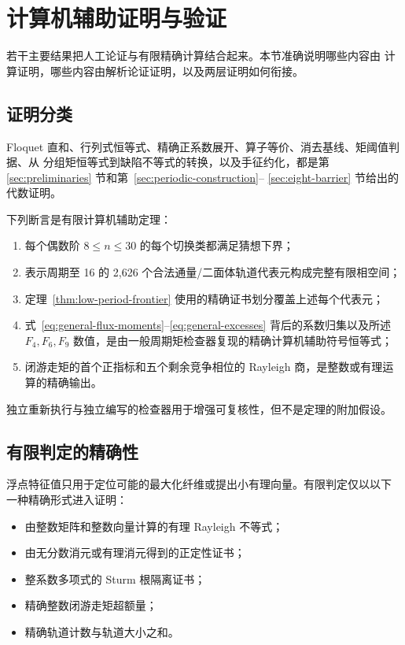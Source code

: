 \section{计算机辅助证明与验证}\label{sec:computational-verification}

若干主要结果把人工论证与有限精确计算结合起来。本节准确说明哪些内容由
计算证明，哪些内容由解析论证证明，以及两层证明如何衔接。

\subsection{证明分类}

Floquet 直和、行列式恒等式、精确正系数展开、算子等价、消去基线、矩阈值判据、从
分组矩恒等式到缺陷不等式的转换，以及手征约化，都是第~
\ref{sec:preliminaries} 节和第~\ref{sec:periodic-construction}--
\ref{sec:eight-barrier} 节给出的代数证明。

下列断言是有限计算机辅助定理：

\begin{enumerate}
\item 每个偶数阶 \(8\leq n\leq30\) 的每个切换类都满足猜想下界；
\item 表示周期至 16 的 2,626 个合法通量/二面体轨道代表元构成完整有限相空间；
\item 定理~\ref{thm:low-period-frontier} 使用的精确证书划分覆盖上述每个代表元；
\item 式~\eqref{eq:general-flux-moments}--\eqref{eq:general-excesses} 背后的系数归集以及所述 \(F_4,F_6,F_9\) 数值，是由一般周期矩检查器复现的精确计算机辅助符号恒等式；
\item 闭游走矩的首个正指标和五个剩余竞争相位的 Rayleigh 商，是整数或有理运算的精确输出。
\end{enumerate}

独立重新执行与独立编写的检查器用于增强可复核性，但不是定理的附加假设。

\subsection{有限判定的精确性}

浮点特征值只用于定位可能的最大化纤维或提出小有理向量。有限判定仅以以下
一种精确形式进入证明：

\begin{itemize}
\item 由整数矩阵和整数向量计算的有理 Rayleigh 不等式；
\item 由无分数消元或有理消元得到的正定性证书；
\item 整系数多项式的 Sturm 根隔离证书；
\item 精确整数闭游走矩超额量；
\item 精确轨道计数与轨道大小之和。
\end{itemize}

